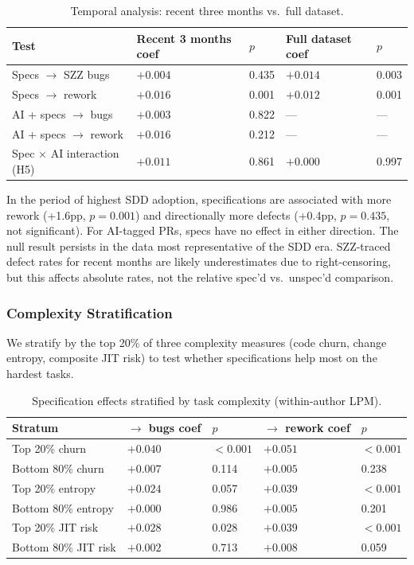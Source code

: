 \documentclass[a4paper,UKenglish,cleveref,autoref,thm-restate]{lipics-v2021}
\begin{document}
\begin{table}[t]
\centering
\caption{Temporal analysis: recent three months vs.\ full dataset.}
\label{tab:temporal}
\begin{tabular}{@{}lllll@{}}
\toprule
\textbf{Test} & \textbf{Recent 3 months coef} & \textbf{$p$} & \textbf{Full dataset coef} & \textbf{$p$} \\
\midrule
Specs $\rightarrow$ SZZ bugs & $+0.004$ & 0.435 & $+0.014$ & 0.003 \\
Specs $\rightarrow$ rework & $+0.016$ & 0.001 & $+0.012$ & 0.001 \\
AI + specs $\rightarrow$ bugs & $+0.003$ & 0.822 & --- & --- \\
AI + specs $\rightarrow$ rework & $+0.016$ & 0.212 & --- & --- \\
Spec $\times$ AI interaction (H5) & $+0.011$ & 0.861 & $+0.000$ & 0.997 \\
\bottomrule
\end{tabular}
\end{table}

In the period of highest SDD adoption, specifications are associated with more rework (+1.6pp, $p = 0.001$) and directionally more defects (+0.4pp, $p = 0.435$, not significant). For AI-tagged PRs, specs have no effect in either direction. The null result persists in the data most representative of the SDD era. SZZ-traced defect rates for recent months are likely underestimates due to right-censoring, but this affects absolute rates, not the relative spec'd vs.\ unspec'd comparison.

\subsubsection{Complexity Stratification}

We stratify by the top 20\% of three complexity measures (code churn, change entropy, composite JIT risk) to test whether specifications help most on the hardest tasks.

\begin{table}[t]
\centering
\caption{Specification effects stratified by task complexity (within-author LPM).}
\label{tab:complexity}
\begin{tabular}{@{}lllll@{}}
\toprule
\textbf{Stratum} & \textbf{$\rightarrow$ bugs coef} & \textbf{$p$} & \textbf{$\rightarrow$ rework coef} & \textbf{$p$} \\
\midrule
Top 20\% churn & $+0.040$ & $< 0.001$ & $+0.051$ & $< 0.001$ \\
Bottom 80\% churn & $+0.007$ & 0.114 & $+0.005$ & 0.238 \\
Top 20\% entropy & $+0.024$ & 0.057 & $+0.039$ & $< 0.001$ \\
Bottom 80\% entropy & $+0.000$ & 0.986 & $+0.005$ & 0.201 \\
Top 20\% JIT risk & $+0.028$ & 0.028 & $+0.039$ & $< 0.001$ \\
Bottom 80\% JIT risk & $+0.002$ & 0.713 & $+0.008$ & 0.059 \\
\bottomrule
\end{tabular}
\end{table}
\end{document}
